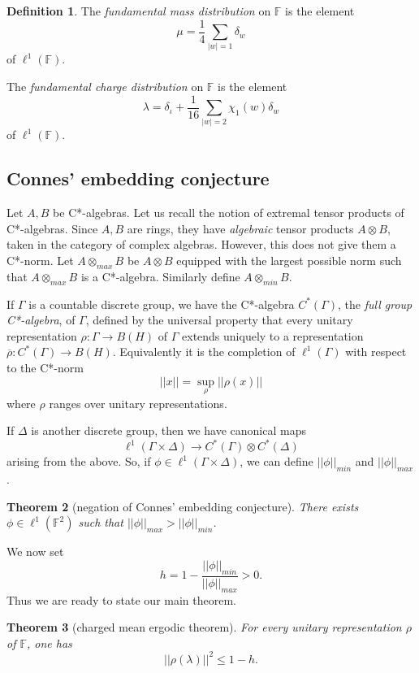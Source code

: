 \documentclass[reqno,12pt,letterpaper]{amsart}
\newtheorem{theorem}{Theorem}[section]
\theoremstyle{definition}
\newtheorem{definition}[theorem]{Definition}
\newcommand{\F}{\mathbb F}
\begin{document}
\begin{definition}
The \emph{fundamental mass distribution} on \(\F\) is the element
$$\mu = \frac{1}{4} \sum_{|w| = 1} \delta_w$$
of \(\ell^1(\F)\).

The \emph{fundamental charge distribution} on \(\F\) is the element
$$\lambda = \delta_\iota + \frac{1}{16} \sum_{|w| = 2} \chi_1(w) \delta_w$$
of \(\ell^1(\F)\).
\end{definition}

\subsection{Connes' embedding conjecture}
\label{sec:org8735eef}

Let \(A, B\) be C*-algebras. Let us recall the notion of extremal tensor products of C*-algebras.
Since \(A, B\) are rings, they have \emph{algebraic} tensor products \(A \otimes B\), taken in the category of complex algebras.
However, this does not give them a C*-norm.
Let \(A \otimes_{max} B\) be \(A \otimes B\) equipped with the largest possible norm such that \(A \otimes_{max} B\) is a C*-algebra.
Similarly define \(A \otimes_{min} B\).

If \(\Gamma\) is a countable discrete group, we have the C*-algebra \(C^*(\Gamma)\), the \emph{full group C*-algebra}, of \(\Gamma\), defined by the universal property that every unitary representation \(\rho: \Gamma \to B(H)\) of \(\Gamma\) extends uniquely to a representation \(\overline \rho: C^*(\Gamma) \to B(H)\).
Equivalently it is the completion of \(\ell^1(\Gamma)\) with respect to the C*-norm
$$||x|| = \sup_\rho ||\rho(x)||$$
where \(\rho\) ranges over unitary representations.

If \(\Delta\) is another discrete group, then we have canonical maps
$$\ell^1(\Gamma \times \Delta) \to C^*(\Gamma) \otimes C^*(\Delta)$$
arising from the above. So, if \(\phi \in \ell^1(\Gamma \times \Delta)\), we can define \(||\phi||_{min}\) and \(||\phi||_{max}\).

\begin{theorem}[negation of Connes' embedding conjecture]
There exists \(\phi \in \ell^1(\F^2)\) such that \(||\phi||_{max} > ||\phi||_{min}\).
\end{theorem}

We now set
$$h = 1 - \frac{||\phi||_{min}}{||\phi||_{max}} > 0.$$
Thus we are ready to state our main theorem.

\begin{theorem}[charged mean ergodic theorem]
For every unitary representation \(\rho\) of \(\F\), one has
$$||\rho(\lambda)||^2 \leq 1 - h.$$
\end{theorem}
\end{document}
